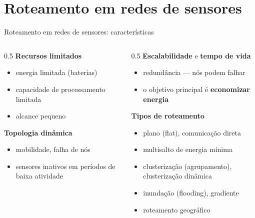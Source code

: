\documentclass[aspectratio=169,11pt]{beamer}
\begin{document}
\section{Roteamento em redes de sensores}

\begin{frame}{Roteamento em redes de sensores: características}
  \begin{columns}
    \begin{column}{0.5\textwidth}
      \textbf{Recursos limitados}
      \begin{itemize}
        \item energia limitada (baterias)
        \item capacidade de processamento limitada
        \item alcance pequeno
      \end{itemize}
      \textbf{Topologia dinâmica}
      \begin{itemize}
        \item mobilidade, falha de nós
        \item sensores inativos em períodos de baixa atividade
      \end{itemize}
    \end{column}
    \begin{column}{0.5\textwidth}
      \textbf{Escalabilidade} e \textbf{tempo de vida}
      \begin{itemize}
        \item redundância --- nós podem falhar
        \item o objetivo principal é \textbf{economizar energia}
      \end{itemize}
      \textbf{Tipos de roteamento}
      \begin{itemize}
        \item plano (flat), comunicação direta
        \item multisalto de energia mínima
        \item clusterização (agrupamento), clusterização dinâmica
        \item inundação (flooding), gradiente
        \item roteamento geográfico
      \end{itemize}
    \end{column}
  \end{columns}
\end{frame}
\end{document}
